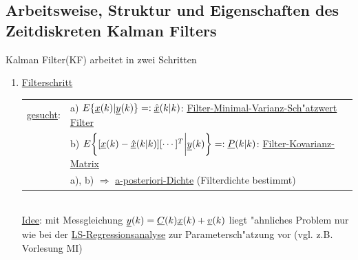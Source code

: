 \documentclass[openany,a4paper,11pt]{book}
\begin{document}
\subsection{Arbeitsweise, Struktur und Eigenschaften des Zeitdiskreten Kalman Filters}
Kalman Filter(KF) arbeitet in zwei Schritten\begin{enumerate}
    \item \uline{Filterschritt}
    \begin{tabular}{ll}
    \uline{gesucht}: & a) $E\{\uline{x}(k)|\uline{y}(k)\}=:\uline{\hat{x}}(k|k)$: \uline{Filter-Minimal-Varianz-Sch"atzwert} \uline{Filter}\\
    & b) $E\bigg\{[\uline{x}(k)-\uline{\hat{x}}(k|k)][\cdots]^T\bigg|\uline{y}(k)\bigg\}=:\uline{P}(k|k)$: \uline{Filter-Kovarianz-Matrix} \\
    & a), b) $\Rightarrow$ \uline{a-posteriori-Dichte} (Filterdichte bestimmt)\\
    \end{tabular}\\
    \uline{Idee}: mit Messgleichung $\uline{y}(k)=\uline{C}(k)\uline{x}(k)+\uline{v}(k)$ liegt "ahnliches Problem nur wie bei der \uline{LS-Regressionsanalyse} zur Parametersch"atzung vor (vgl. z.B. Vorlesung MI)\\[3pt]
    \\
    \\

\end{enumerate}
\end{document}
